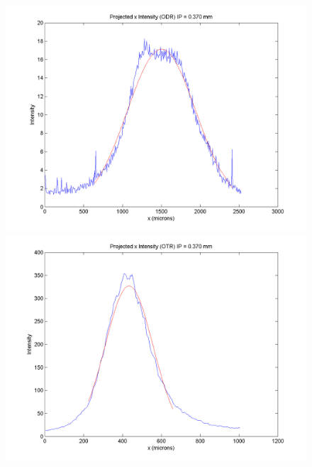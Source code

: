 \documentclass[12pt]{article}
\begin{document}
\begin{figure}
\begin{center}
\includegraphics[scale=0.5]{Figures/ProjX_ODR_370.PNG}
\includegraphics[scale=0.5]{Figures/ProjX_OTR_370.PNG}
\caption{}
\end{center}
\end{figure}
\end{document}
